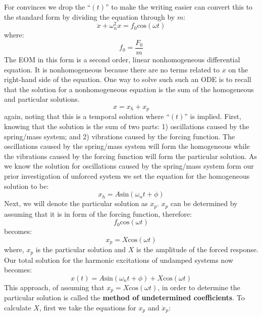 \documentclass[12pt,letter]{article}
\numberwithin{ex}{section} %
\numberwithin{re}{section} %
\begin{document}
			For convinces we drop the ``$(t)$'' to make the writing easier can convert this to the standard form by dividing the equation through by $m$:					
			\begin{equation}
				\ddot{x}+\omega_n^2x = f_0\text{cos}(\omega t)
			\end{equation}					
			where:
			\begin{equation}
				f_0 = \frac{F_0}{m}
			\end{equation}	
			The EOM in this form is a second order, linear nonhomogeneous differential equation. It is nonhomogeneous because there are no terms related to $x$ on the right-hand side of the equation. One way to solve such such an ODE is to recall that the solution for a nonhomogeneous equation is the sum of the homogeneous and particular solutions. 
			\begin{equation}
				x = x_h + x_p
			\end{equation}	
			again, noting that this is a temporal solution where ``$(t)$'' is implied. First, knowing that the solution is the sum of two parts: 1) oscillations caused by the spring/mass system; and 2) vibrations caused by the forcing function. The oscillations caused by the spring/mass system will form the homogeneous while the vibrations caused by the forcing function will form the particular solution. As we know the solution for oscillations caused by the spring/mass system form our prior investigation of unforced system we set the equation for the homogeneous solution to be:
			\begin{equation}
				x_h = A\text{sin}(\omega_n t + \phi)
			\end{equation}			
			Next, we will denote the particular solution as $x_p$. $x_p$ can be determined by assuming that it is in form of the forcing function, therefore:
			\begin{equation}
				f_0\text{cos}(\omega t)
			\end{equation}	
			becomes:
			\begin{equation}
				x_p  =X\text{cos}(\omega t)
			\end{equation}						
			where, $x_p$ is the particular solution and $X$ is the amplitude of the forced response. Our total solution for the harmonic excitations of undamped systems now becomes:
			\begin{equation}
				x(t) = A\text{sin}(\omega_n t + \phi) + X\text{cos}(\omega t) 
			\end{equation}				
			This approach, of assuming that $x_p=X\text{cos}(\omega t)$, in order to determine the particular solution is called the \textbf{method of undetermined coefficients}. To calculate $X$, first we take the equations for $x_p$ and $\ddot{x}_p $:
\end{document}
